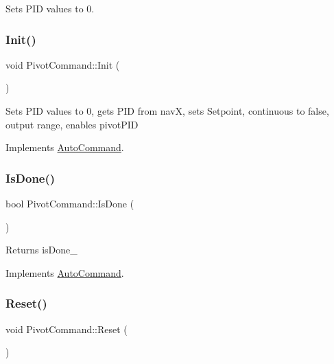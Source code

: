 Sets P\+ID values to 0. \mbox{\label{class_pivot_command_a4bc3497678e5fdc84e0ec545f87fcd2a}} 
\subsubsection{\texorpdfstring{Init()}{Init()}}
{\footnotesize\ttfamily void Pivot\+Command\+::\+Init (\begin{DoxyParamCaption}{ }\end{DoxyParamCaption})\hspace{0.3cm}{\ttfamily [virtual]}}

Sets P\+ID values to 0, gets P\+ID from navX, sets Setpoint, continuous to false, output range, enables pivot\+P\+ID 

Implements \hyperlink{class_auto_command}{Auto\+Command}.

\mbox{\label{class_pivot_command_acc8ed3e6a76a19a05201131f0bd7ccc5}} 
\subsubsection{\texorpdfstring{Is\+Done()}{IsDone()}}
{\footnotesize\ttfamily bool Pivot\+Command\+::\+Is\+Done (\begin{DoxyParamCaption}{ }\end{DoxyParamCaption})\hspace{0.3cm}{\ttfamily [virtual]}}

\begin{DoxyReturn}{Returns}
is\+Done\+\_\+ 
\end{DoxyReturn}


Implements \hyperlink{class_auto_command}{Auto\+Command}.

\mbox{\label{class_pivot_command_a728a96471b607920a8e3581b15c2a6ed}} 
\subsubsection{\texorpdfstring{Reset()}{Reset()}}
{\footnotesize\ttfamily void Pivot\+Command\+::\+Reset (\begin{DoxyParamCaption}{ }\end{DoxyParamCaption})}

